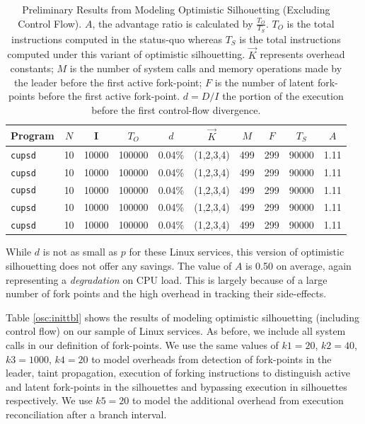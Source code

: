 \begin{table}[h]
  \caption{Preliminary Results from Modeling Optimistic Silhouetting (Excluding Control Flow). \newline \newline 
  $A$, the advantage ratio is calculated by $\frac{T_O}{T_S}$.
  $T_O$ is the total instructions computed in the status-quo whereas $T_S$ is the total instructions computed under
  this variant of optimistic silhouetting. $\vec K$ represents overhead constants; $M$ is the number
  of system calls and memory operations made by the leader before the first active fork-point; $F$
  is the number of latent fork-points before the first active fork-point. $d = D/I$
  the portion of the execution before the first control-flow divergence. }
\label{osnc:inittbl}
\begin{center}
\begin{tabular}{|l||c|c||c||c|c|c|c||c||c|}\hline
  Program & $N$ & I & $T_O$ & $d$ & $\vec K$ & $M$ & $F$ & $T_S$ & $A$ \\\hline
  \texttt{cupsd} & 10 & 10000 & 100000 & 0.04\% & (1,2,3,4) & 499 & 299 & 90000 & 1.11  \\\hline
  \texttt{cupsd} & 10 & 10000 & 100000 & 0.04\% & (1,2,3,4) & 499 & 299 & 90000 & 1.11  \\\hline
  \texttt{cupsd} & 10 & 10000 & 100000 & 0.04\% & (1,2,3,4) & 499 & 299 & 90000 & 1.11  \\\hline
  \texttt{cupsd} & 10 & 10000 & 100000 & 0.04\% & (1,2,3,4) & 499 & 299 & 90000 & 1.11  \\\hline
  \texttt{cupsd} & 10 & 10000 & 100000 & 0.04\% & (1,2,3,4) & 499 & 299 & 90000 & 1.11  \\\hline
\end{tabular}
\end{center}
\end{table}

While $d$ is not as small as $p$
for these Linux services, this version of 
optimistic silhouetting does not offer any savings.
The value of $A$ is 0.50
on average, again representing a {\em degradation}
on CPU load.
This is largely because of a large 
number of fork points and the high overhead
in tracking their side-effects. \newline

 \newline
Table \ref{osc:inittbl} shows the results of modeling 
optimistic silhouetting (including control flow) on our sample of Linux services.
As before, we include all system calls in our definition
of fork-points. We use the same values of $k1 = 20$, $k2 = 40$, $k3 = 1000$, $k4 = 20$
to model overheads from detection of fork-points in the leader,
taint propagation, execution of forking instructions to distinguish
active and latent fork-points in the silhouettes and
bypassing execution in silhouettes respectively.
We use $k5 = 20$ to model the additional
overhead from execution reconciliation
after a branch interval.

